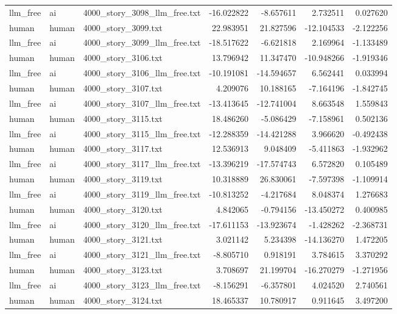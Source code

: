 \begin{longtable}{lllrrrr}
llm\_free & ai & 4000\_story\_3098\_llm\_free.txt & -16.022822 & -8.657611 & 2.732511 & 0.027620 \\
human & human & 4000\_story\_3099.txt & 22.983951 & 21.827596 & -12.104533 & -2.122256 \\
llm\_free & ai & 4000\_story\_3099\_llm\_free.txt & -18.517622 & -6.621818 & 2.169964 & -1.133489 \\
human & human & 4000\_story\_3106.txt & 13.796942 & 11.347470 & -10.948266 & -1.919346 \\
llm\_free & ai & 4000\_story\_3106\_llm\_free.txt & -10.191081 & -14.594657 & 6.562441 & 0.033994 \\
human & human & 4000\_story\_3107.txt & 4.209076 & 10.188165 & -7.164196 & -1.842745 \\
llm\_free & ai & 4000\_story\_3107\_llm\_free.txt & -13.413645 & -12.741004 & 8.663548 & 1.559843 \\
human & human & 4000\_story\_3115.txt & 18.486260 & -5.086429 & -7.158961 & 0.502136 \\
llm\_free & ai & 4000\_story\_3115\_llm\_free.txt & -12.288359 & -14.421288 & 3.966620 & -0.492438 \\
human & human & 4000\_story\_3117.txt & 12.536913 & 9.048409 & -5.411863 & -1.932962 \\
llm\_free & ai & 4000\_story\_3117\_llm\_free.txt & -13.396219 & -17.574743 & 6.572820 & 0.105489 \\
human & human & 4000\_story\_3119.txt & 10.318889 & 26.830061 & -7.597398 & -1.109914 \\
llm\_free & ai & 4000\_story\_3119\_llm\_free.txt & -10.813252 & -4.217684 & 8.048374 & 1.276683 \\
human & human & 4000\_story\_3120.txt & 4.842065 & -0.794156 & -13.450272 & 0.400985 \\
llm\_free & ai & 4000\_story\_3120\_llm\_free.txt & -17.611153 & -13.923674 & -1.428262 & -2.368731 \\
human & human & 4000\_story\_3121.txt & 3.021142 & 5.234398 & -14.136270 & 1.472205 \\
llm\_free & ai & 4000\_story\_3121\_llm\_free.txt & -8.805710 & 0.918191 & 3.784615 & 3.370292 \\
human & human & 4000\_story\_3123.txt & 3.708697 & 21.199704 & -16.270279 & -1.271956 \\
llm\_free & ai & 4000\_story\_3123\_llm\_free.txt & -8.156291 & -6.357801 & 4.024520 & 2.740561 \\
human & human & 4000\_story\_3124.txt & 18.465337 & 10.780917 & 0.911645 & 3.497200 \\

\end{longtable}

